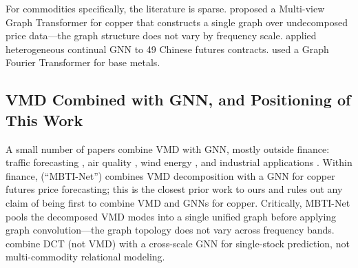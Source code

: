 \documentclass[journal]{IEEEtran}
\begin{document}
For commodities specifically, the literature is sparse. \citet{Sun2025} proposed a Multi-view Graph Transformer for copper that constructs a single graph over undecomposed price data---the graph structure does not vary by frequency scale. \citet{Hu2023} applied heterogeneous continual GNN to 49 Chinese futures contracts. \citet{Zhai2024} used a Graph Fourier Transformer for base metals.

\subsection{VMD Combined with GNN, and Positioning of This Work}

A small number of papers combine VMD with GNN, mostly outside finance: traffic forecasting \citep{Ahmad2024, Ahmad2025}, air quality \citep{Pei2022}, wind energy \citep{ChengTsai2026, Bao2025}, and industrial applications \citep{Yuan2025}. Within finance, \citet{LiLiu2026} (``MBTI-Net'') combines VMD decomposition with a GNN for copper futures price forecasting; this is the closest prior work to ours and rules out any claim of being first to combine VMD and GNNs for copper. Critically, MBTI-Net pools the decomposed VMD modes into a single unified graph before applying graph convolution---the graph topology does not vary across frequency bands. \citet{ZhengZhufu2025} combine DCT (not VMD) with a cross-scale GNN for single-stock prediction, not multi-commodity relational modeling.
\end{document}
